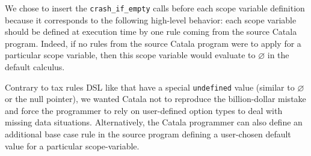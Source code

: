 \documentclass[11pt,a4paper]{article}
\newcommand{\synvar}[1]{\ensuremath{#1}}
\newcommand{\synkeyword}[1]{\textcolor{red!60!black}{\texttt{#1}}}
\newcommand{\synemptydefault}{\synvar{\varnothing}}
\newcommand{\syncrashifempty}{\synkeyword{crash\_if\_empty}}
\begin{document}
We chose to insert the \syncrashifempty{} calls before each scope variable 
definition because it corresponds to the following high-level behavior:
each scope variable should be defined at execution time by one rule coming 
from the source Catala program. Indeed, if no rules from the source 
Catala program were to apply for a particular scope variable, then this 
scope variable would evaluate to \synemptydefault{} in the default calculus.

Contrary to tax rules DSL like \cite{merigoux:hal-02936606} that have a special 
\texttt{undefined} value (similar to \synemptydefault{} or the null pointer), 
we wanted Catala not to reproduce the billion-dollar mistake and force the 
programmer to rely on user-defined option types to deal with missing data 
situations. Alternatively, the Catala programmer can also define an additional 
base case rule in the source program defining a user-chosen default value 
for a particular scope-variable. 

\printbibliography
\end{document}
